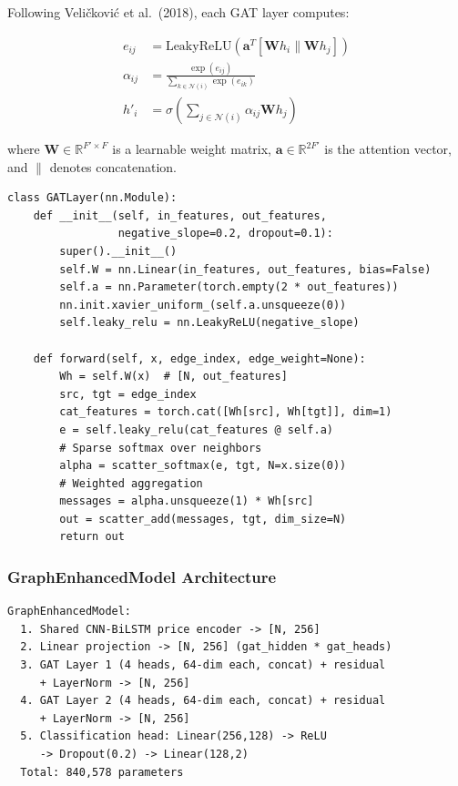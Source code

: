 \documentclass[12pt,a4paper]{article}
\begin{document}
Following Veli\v{c}kovi\'{c} et al.\ (2018), each GAT layer computes:

\begin{align}
e_{ij} &= \text{LeakyReLU}\left(\mathbf{a}^T [\mathbf{W}h_i \| \mathbf{W}h_j]\right) \\
\alpha_{ij} &= \frac{\exp(e_{ij})}{\sum_{k \in \mathcal{N}(i)} \exp(e_{ik})} \\
h'_i &= \sigma\left(\sum_{j \in \mathcal{N}(i)} \alpha_{ij} \mathbf{W} h_j\right)
\end{align}

where $\mathbf{W} \in \mathbb{R}^{F' \times F}$ is a learnable weight matrix, $\mathbf{a} \in \mathbb{R}^{2F'}$ is the attention vector, and $\|$ denotes concatenation.

\begin{lstlisting}[caption={GATLayer core attention (\texttt{src/models/gat\_model.py})}]
class GATLayer(nn.Module):
    def __init__(self, in_features, out_features,
                 negative_slope=0.2, dropout=0.1):
        super().__init__()
        self.W = nn.Linear(in_features, out_features, bias=False)
        self.a = nn.Parameter(torch.empty(2 * out_features))
        nn.init.xavier_uniform_(self.a.unsqueeze(0))
        self.leaky_relu = nn.LeakyReLU(negative_slope)

    def forward(self, x, edge_index, edge_weight=None):
        Wh = self.W(x)  # [N, out_features]
        src, tgt = edge_index
        cat_features = torch.cat([Wh[src], Wh[tgt]], dim=1)
        e = self.leaky_relu(cat_features @ self.a)
        # Sparse softmax over neighbors
        alpha = scatter_softmax(e, tgt, N=x.size(0))
        # Weighted aggregation
        messages = alpha.unsqueeze(1) * Wh[src]
        out = scatter_add(messages, tgt, dim_size=N)
        return out
\end{lstlisting}

\subsubsection{GraphEnhancedModel Architecture}

\begin{lstlisting}[caption={Full GAT architecture summary}]
GraphEnhancedModel:
  1. Shared CNN-BiLSTM price encoder -> [N, 256]
  2. Linear projection -> [N, 256] (gat_hidden * gat_heads)
  3. GAT Layer 1 (4 heads, 64-dim each, concat) + residual
     + LayerNorm -> [N, 256]
  4. GAT Layer 2 (4 heads, 64-dim each, concat) + residual
     + LayerNorm -> [N, 256]
  5. Classification head: Linear(256,128) -> ReLU
     -> Dropout(0.2) -> Linear(128,2)
  Total: 840,578 parameters
\end{lstlisting}
\end{document}
